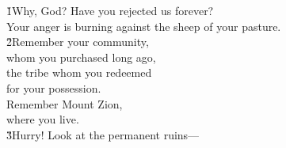 \begin{poetry}
\poeml \v{1}Why, God? Have you rejected us forever? \\
\poemll    Your anger is burning against the sheep of your pasture. \\
\poeml \v{2}Remember your community, \\
\poeml whom you purchased long ago, \\
\poeml the tribe whom you redeemed \\
\poemll    for your possession. \\
\poeml Remember Mount Zion, \\
\poemll    where you live. \\
\poemlll       \v{3}Hurry! Look at the permanent ruins---
\end{poetry}

